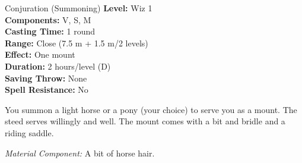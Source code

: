 {Conjuration (Summoning)}
{
	\textbf{Level:}
	Wiz 1\\
	\textbf{Components:}
	V, S, M\\
	\textbf{Casting Time:}
	1 round\\
	\textbf{Range:}
	Close (7.5 m + 1.5 m/2 levels)\\
	\textbf{Effect:}
	One mount\\
	\textbf{Duration:}
	2 hours/level (D)\\
	\textbf{Saving Throw:}
	None\\
	\textbf{Spell Resistance:}
	No\\
}
{
	You summon a light horse or a pony (your choice) to serve you as a mount. The steed serves willingly and well. The mount comes with a bit and bridle and a riding saddle.

	\textit{Material Component:}
	A bit of horse hair.

}
